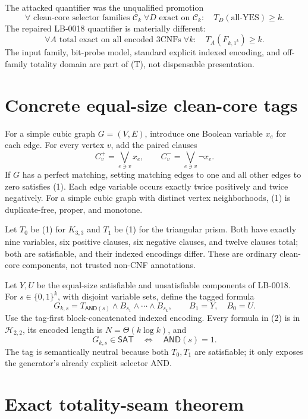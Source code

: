 \documentclass[11pt]{article}
\newcommand{\SAT}{\mathsf{SAT}}
\newcommand{\AND}{\mathsf{AND}}
\newcommand{\Htwo}{\mathcal H_{2,2}}
\begin{document}
The attacked quantifier was the unqualified promotion
\[
 \forall\text{ clean-core selector families }\mathcal C_k\;
 \forall D\text{ exact on }\mathcal C_k:\quad
 T_D(\text{all-YES})\ge k.                         \tag{P}
\]
The repaired LB-0018 quantifier is materially different:
\[
 \forall A\text{ total exact on all encoded $3$CNFs}\;\forall k:\quad
 T_A(F_{k,1^k})\ge k.                              \tag{T}
\]
The input family, bit-probe model, standard explicit indexed encoding, and
off-family totality domain are part of (T), not dispensable presentation.

\section{Concrete equal-size clean-core tags}

For a simple cubic graph $G=(V,E)$, introduce one Boolean variable $x_e$ for
each edge.  For every vertex $v$, add the paired clauses
\[
 C_v^+=\bigvee_{e\ni v}x_e,
 \qquad
 C_v^-=\bigvee_{e\ni v}\neg x_e.                  \tag{1}
\]
If $G$ has a perfect matching, setting matching edges to one and all other
edges to zero satisfies (1).  Each edge variable occurs exactly twice
positively and twice negatively.  For a simple cubic graph with distinct
vertex neighborhoods, (1) is duplicate-free, proper, and monotone.

Let $T_0$ be (1) for $K_{3,3}$ and $T_1$ be (1) for the triangular prism.
Both have exactly nine variables, six positive clauses, six negative clauses,
and twelve clauses total; both are satisfiable, and their indexed encodings
differ.  These are ordinary clean-core components, not trusted non-CNF
annotations.

Let $Y,U$ be the equal-size satisfiable and unsatisfiable components of
LB-0018.  For $s\in\{0,1\}^k$, with disjoint variable sets, define the tagged
formula
\[
 G_{k,s}=T_{\AND(s)}\wedge B_{s_1}\wedge\cdots\wedge B_{s_k},
 \qquad B_1=Y,\quad B_0=U.                         \tag{2}
\]
Use the tag-first block-concatenated indexed encoding.  Every formula in (2)
is in $\Htwo$, its encoded length is $N=\Theta(k\log k)$, and
\[
 G_{k,s}\in\SAT\quad\Longleftrightarrow\quad \AND(s)=1. \tag{3}
\]
The tag is semantically neutral because both $T_0,T_1$ are satisfiable; it
only exposes the generator's already explicit selector AND.

\section{Exact totality-seam theorem}
\end{document}

